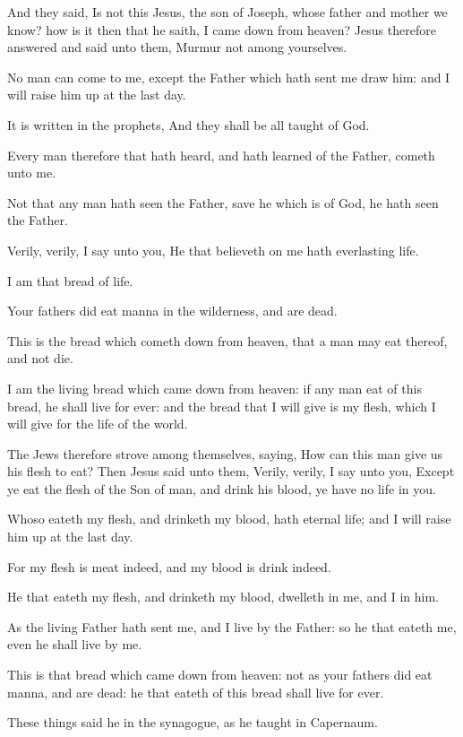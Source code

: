 \Verse And they said, Is not this Jesus, the son of Joseph, whose father and mother we know? how is it then that he saith, I came down from heaven?  \Verse Jesus therefore answered and said unto them, Murmur not among yourselves.

\Verse No man can come to me, except the Father which hath sent me draw him: and I will raise him up at the last day.

\Verse It is written in the prophets, And they shall be all taught of God.

Every man therefore that hath heard, and hath learned of the Father, cometh unto me.

\Verse Not that any man hath seen the Father, save he which is of God, he hath seen the Father.

\Verse Verily, verily, I say unto you, He that believeth on me hath everlasting life.

\Verse I am that bread of life.

\Verse Your fathers did eat manna in the wilderness, and are dead.

\Verse This is the bread which cometh down from heaven, that a man may eat thereof, and not die.

\Verse I am the living bread which came down from heaven: if any man eat of this bread, he shall live for ever: and the bread that I will give is my flesh, which I will give for the life of the world.

\Verse The Jews therefore strove among themselves, saying, How can this man give us his flesh to eat?  \Verse Then Jesus said unto them, Verily, verily, I say unto you, Except ye eat the flesh of the Son of man, and drink his blood, ye have no life in you.

\Verse Whoso eateth my flesh, and drinketh my blood, hath eternal life; and I will raise him up at the last day.

\Verse For my flesh is meat indeed, and my blood is drink indeed.

\Verse He that eateth my flesh, and drinketh my blood, dwelleth in me, and I in him.

\Verse As the living Father hath sent me, and I live by the Father: so he that eateth me, even he shall live by me.

\Verse This is that bread which came down from heaven: not as your fathers did eat manna, and are dead: he that eateth of this bread shall live for ever.

\Verse These things said he in the synagogue, as he taught in Capernaum.

